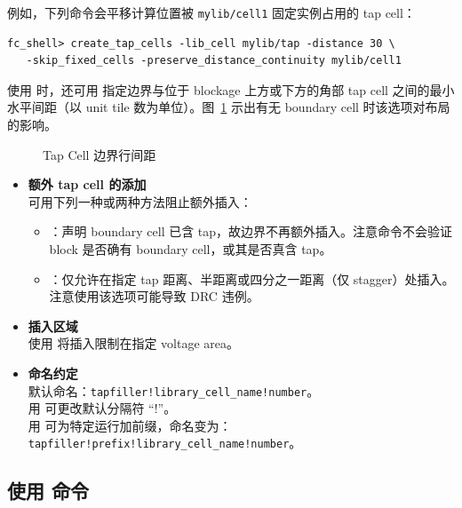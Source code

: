 例如，下列命令会平移计算位置被 \texttt{mylib/cell1} 固定实例占用的 tap cell：
\begin{lstlisting}
fc_shell> create_tap_cells -lib_cell mylib/tap -distance 30 \
   -skip_fixed_cells -preserve_distance_continuity mylib/cell1
\end{lstlisting}

使用  时，还可用  指定边界与位于 blockage 上方或下方的角部 tap cell 之间的最小水平间距（以 unit tile 数为单位）。图~\ref{fig:tap-boundary-spacing} 示出有无 boundary cell 时该选项对布局的影响。

\begin{figure}[htbp]
\centering
{}
\caption{Tap Cell 边界行间距}
\label{fig:tap-boundary-spacing}
\end{figure}

\begin{itemize}
  \item \textbf{额外 tap cell 的添加}\\
        可用下列一种或两种方法阻止额外插入：
        \begin{itemize}
          \item {}：声明 boundary cell 已含 tap，故边界不再额外插入。注意命令不会验证 block 是否确有 boundary cell，或其是否真含 tap。
          \item \opt{-at\_distance\_only}：仅允许在指定 tap 距离、半距离或四分之一距离（仅 stagger）处插入。注意使用该选项可能导致 DRC 违例。
        \end{itemize}
  \item \textbf{插入区域}\\
        使用  将插入限制在指定 voltage area。
  \item \textbf{命名约定}\\
        默认命名：\texttt{tapfiller!library\_cell\_name!number}。\\
        用  可更改默认分隔符 ``!''。\\
        用  可为特定运行加前缀，命名变为：\texttt{tapfiller!prefix!library\_cell\_name!number}。
\end{itemize}

\subsection{使用  命令}
